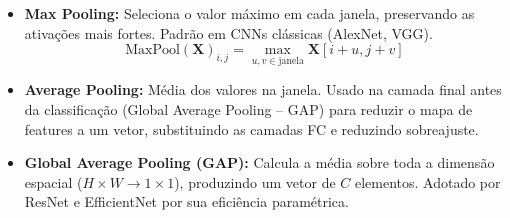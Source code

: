 \begin{itemize}
  \item \textbf{Max Pooling:} Seleciona o valor máximo em cada janela, preservando
        as ativações mais fortes. Padrão em CNNs clássicas (AlexNet, VGG).
        \begin{equation}
          \text{MaxPool}(\mathbf{X})_{i,j} = \max_{u,v \in \text{janela}} \mathbf{X}[i+u, j+v]
          \label{eq:maxpool}
        \end{equation}
  \item \textbf{Average Pooling:} Média dos valores na janela. Usado na camada
        final antes da classificação (Global Average Pooling -- GAP) para reduzir
        o mapa de features a um vetor, substituindo as camadas FC e reduzindo
        sobreajuste.
  \item \textbf{Global Average Pooling (GAP):} Calcula a média sobre toda a
        dimensão espacial ($H \times W \to 1 \times 1$), produzindo um vetor de
        $C$ elementos. Adotado por ResNet e EfficientNet por sua eficiência
        paramétrica.
\end{itemize}



